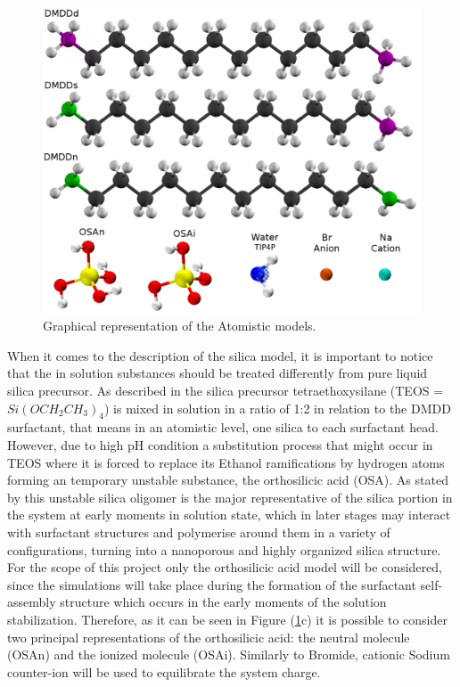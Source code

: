 \documentclass[10pt,a4paper,twoside]{article}
\begin{document}
   \begin{figure}[ht!]
  \begin{center}
	\includegraphics[width=1\textwidth]{./images/molsAA}
	\caption{Graphical representation of the Atomistic models.}
	\label{Fig:atomistic}
  \end{center}
\end{figure}

When it comes to the description of the silica model, it is important to notice that the in solution substances should be treated differently from pure liquid silica precursor. As described in \cite{msuv} the silica precursor tetraethoxysilane (TEOS = $Si(OCH_2CH_3)_4$) is mixed in solution in a ratio of 1:2 in relation to the DMDD surfactant, that means in an atomistic level, one silica to each surfactant head.  However, due to high pH condition a substitution process that might occur in TEOS where it is forced to replace its Ethanol ramifications by hydrogen atoms forming an temporary unstable substance, the orthosilicic acid (OSA). As stated by \cite{mjsilica} this unstable silica oligomer is the major representative of the silica portion in the system at early moments in solution state, which in later stages may interact with surfactant structures and polymerise around them in a variety of configurations, turning into a nanoporous and highly organized silica structure. For the scope of this project only the orthosilicic acid model will be considered, since the simulations will take place during the formation of the surfactant self-assembly structure which occurs in the early moments of the solution stabilization. Therefore, as it can be seen in Figure (\ref{Fig:atomistic}c) it is possible to consider two principal representations of the orthosilicic acid: the neutral molecule (OSAn) and the ionized molecule (OSAi). Similarly to Bromide, cationic Sodium counter-ion will be used to equilibrate the system charge.
\end{document}
